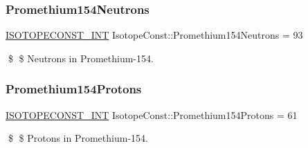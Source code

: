 \subsubsection{\texorpdfstring{Promethium154\+Neutrons}{Promethium154Neutrons}}
{\footnotesize\ttfamily \mbox{\hyperlink{group___isotope_const-_macros_ga5f18360b3e99483a35c32d789e62621c}{I\+S\+O\+T\+O\+P\+E\+C\+O\+N\+S\+T\+\_\+\+I\+NT}} Isotope\+Const\+::\+Promethium154\+Neutrons = 93}

\$ \$ Neutrons in Promethium-\/154. \mbox{\label{group___isotope_const-_promethium-_pm154_ga65a7358f24b68fa32336a1bbb2f7543d}} 
\subsubsection{\texorpdfstring{Promethium154\+Protons}{Promethium154Protons}}
{\footnotesize\ttfamily \mbox{\hyperlink{group___isotope_const-_macros_ga5f18360b3e99483a35c32d789e62621c}{I\+S\+O\+T\+O\+P\+E\+C\+O\+N\+S\+T\+\_\+\+I\+NT}} Isotope\+Const\+::\+Promethium154\+Protons = 61}

\$ \$ Protons in Promethium-\/154. 